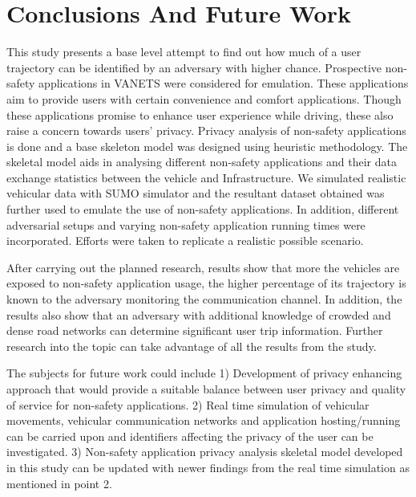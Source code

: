 \chapter{Conclusions And Future Work}

This study presents a base level attempt to find out how much of a user trajectory can be identified by an adversary with higher chance. Prospective non-safety applications in \ac{VANETS} were considered for emulation. These applications aim to provide users with certain
convenience and comfort applications. Though these applications promise to enhance user experience while driving, these also raise a concern towards users' privacy. Privacy analysis of non-safety applications is done and a base skeleton model was designed using heuristic methodology. The skeletal model aids in analysing different non-safety applications and their data exchange statistics between the vehicle and Infrastructure. We simulated realistic vehicular data with \ac{SUMO} simulator and the resultant dataset obtained was further used to emulate the use of non-safety applications. In addition, different adversarial setups and varying non-safety application running times were incorporated. Efforts were taken to replicate a realistic possible scenario.

After carrying out the planned research, results show that more the vehicles are exposed to non-safety application usage, the higher percentage of its trajectory is known to the adversary monitoring the communication channel. In addition, the results also show that an adversary with additional knowledge of crowded and dense road networks can determine significant user trip information. Further research into the topic can take advantage of all the results from the study.

The subjects for future work could include 1) Development of privacy enhancing approach that would provide a suitable balance between user privacy and quality of service for non-safety applications. 2) Real time simulation of vehicular movements, vehicular communication networks and application hosting/running can be carried upon and identifiers affecting the privacy of the user can be investigated. 3) Non-safety application privacy analysis skeletal model developed in this study can be updated with newer findings from the real time simulation as mentioned in point 2. 
